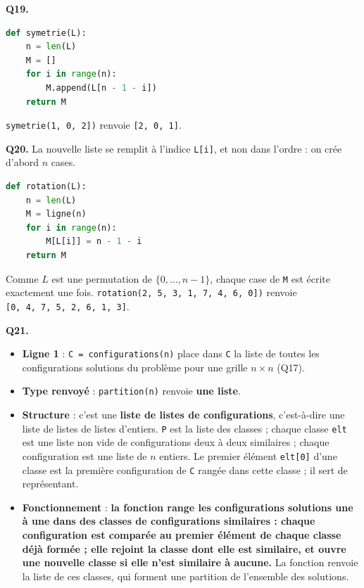 \documentclass[11pt,a4paper]{article}
\providecommand{\tightlist}{\setlength{\itemsep}{0pt}\setlength{\parskip}{0pt}}
\begin{document}
\textbf{Q19.}

\begin{lstlisting}[language=Python]
def symetrie(L):
    n = len(L)
    M = []
    for i in range(n):
        M.append(L[n - 1 - i])
    return M
\end{lstlisting}

\texttt{symetrie(\allowbreak{}{[}1,\allowbreak{}\ 0,\allowbreak{}\ 2{]}\allowbreak{})\allowbreak{}} renvoie \texttt{{[}2,\ 0,\ 1{]}}.

\textbf{Q20.} La nouvelle liste se remplit à l'indice \texttt{L{[}i{]}}, et non dans l'ordre : on crée d'abord \(n\) cases.

\begin{lstlisting}[language=Python]
def rotation(L):
    n = len(L)
    M = ligne(n)
    for i in range(n):
        M[L[i]] = n - 1 - i
    return M
\end{lstlisting}

Comme \(L\) est une permutation de \(\{0, \dots, n-1\}\), chaque case de \texttt{M} est écrite exactement une fois. \texttt{rotation(\allowbreak{}{[}2,\allowbreak{}\ 5,\allowbreak{}\ 3,\allowbreak{}\ 1,\allowbreak{}\ 7,\allowbreak{}\ 4,\allowbreak{}\ 6,\allowbreak{}\ 0{]}\allowbreak{})\allowbreak{}} renvoie \texttt{{[}0,\allowbreak{}\ 4,\allowbreak{}\ 7,\allowbreak{}\ 5,\allowbreak{}\ 2,\allowbreak{}\ 6,\allowbreak{}\ 1,\allowbreak{}\ 3{]}\allowbreak{}}.

\textbf{Q21.}

\begin{itemize}
\tightlist
\item
  \textbf{Ligne 1} : \texttt{C\ =\allowbreak{}\ configurations(\allowbreak{}n)\allowbreak{}} place dans \texttt{C} la liste de toutes les configurations solutions du problème pour une grille \(n \times n\) (Q17).
\item
  \textbf{Type renvoyé} : \texttt{partition(n)} renvoie \textbf{une liste}.
\item
  \textbf{Structure} : c'est une \textbf{liste de listes de configurations}, c'est-à-dire une liste de listes de listes d'entiers. \texttt{P} est la liste des classes ; chaque classe \texttt{elt} est une liste non vide de configurations deux à deux similaires ; chaque configuration est une liste de \(n\) entiers. Le premier élément \texttt{elt{[}0{]}} d'une classe est la première configuration de \texttt{C} rangée dans cette classe ; il sert de représentant.
\item
  \textbf{Fonctionnement} : \textbf{la fonction range les configurations solutions une à une dans des classes de configurations similaires : chaque configuration est comparée au premier élément de chaque classe déjà formée ; elle rejoint la classe dont elle est similaire, et ouvre une nouvelle classe si elle n'est similaire à aucune.} La fonction renvoie la liste de ces classes, qui forment une partition de l'ensemble des solutions.
\end{itemize}
\end{document}
